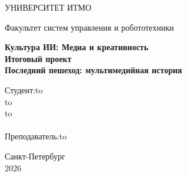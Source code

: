 \documentclass[12pt, a4paper]{article}
\begin{document}
\begin{titlepage}
\newpage

\begin{center}
УНИВЕРСИТЕТ ИТМО
\end{center}

\vspace{4em}

\begin{center}
Факультет систем управления и робототехники \\
\end{center}

\vspace{6em}

\begin{center}
\large \textbf{Культура ИИ: Медиа и креативность\\
Итоговый проект\\
Последний пешеход: мультимедийная история}
\end{center}

\vspace{8em}

\newbox{\lbox}
\newlength{\maxl}
\setlength{\maxl}{\wd\lbox}\addtolength{\maxl}{10pt}
\hfill\parbox{12cm}{
\hspace*{5cm}\hspace*{-5cm}Студент:\hfill\hbox to\\
\hspace*{5cm}\hspace*{-5cm}\hfill\hbox to\\
\hspace*{5cm}\hspace*{-5cm}\hfill\hbox to\\
\\
\hspace*{5cm}\hspace*{-5cm}Преподаватель:\hfill\hbox to
}

\vspace{\fill}

\begin{center}
Санкт-Петербург \\2026
\end{center}

\end{titlepage}

\tableofcontents

\end{document}
